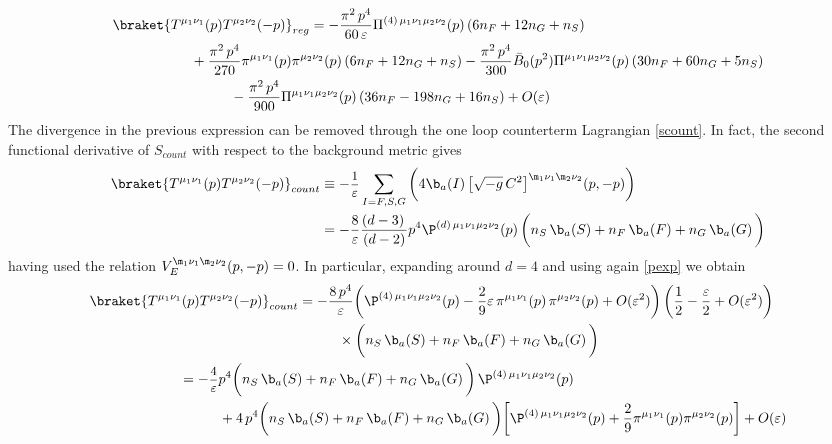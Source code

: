 \documentclass[a4paper,11pt,openright,twoside]{book}
\let\n=\nu      \let\x=\xi     \let\p=\pi      \let\r=\rho
\newcommand{\sdfrac}[2]{\mbox{\small$\displaystyle\frac{#1}{#2}$}}
\numberwithin{equation}{section}
\begin{document}
{{\begin{align}
	\label{regular}
	\braket{T^{\mu_1\nu_1}(p)T^{\mu_2\nu_2}(-p)}_{reg}&=-\frac{\p^2\,p^4}{60\,\varepsilon}\Pi^{(4)\,\mu_1\nu_1\mu_2\nu_2}(p)\left(6 n_F + 12 n_G + n_S\right)\notag\\
	&\hspace{-3cm}+\frac{\p^2\,p^4}{270}\p^{\mu_1\nu_1}(p)\p^{\mu_2\nu_2}(p)\left(6 n_F + 12 n_G + n_S\right)-\frac{\p^2\,p^4}{300}\bar{B}_0(p^2)\Pi^{\mu_1\nu_1\mu_2\nu_2}(p)\left(30n_F+60n_G+5n_S\right)\notag\\
	&\hspace{-2cm}-\frac{\p^2\,p^4}{900}\Pi^{\mu_1\nu_1\mu_2\nu_2}(p)\left(36n_F-198 n_G+16n_S\right)+O(\varepsilon)
\end{align}
The divergence in the previous expression can be removed through the one loop counterterm Lagrangian \eqref{scount}. In fact, the second functional derivative of $S_{count}$ with respect to the background metric gives 
\begin{align}
	\braket{T^{\mu_1\nu_1}(p)T^{\mu_2\nu_2}(-p)}_{count}&\equiv -\sdfrac{1}{\varepsilon}\sum_{I=F,S,G}\bigg(4\b_a(I)\,\big[\sqrt{-g}\,C^2\big]^{\m_1\n_1\m_2\n_2}(p,-p)\bigg)\notag\\
	&=-\frac{8}{\varepsilon}\frac{(d-3)\,}{(d-2)}p^4\P^{(d)\,\mu_1\nu_1\mu_2\nu_2}(p)\,\bigg(n_S\,\b_a(S)+n_F\,\b_a(F)+n_G\,\b_a(G)\,\bigg)
\end{align}
having used the relation $V_{E}^{\m_1\n_1\m_2\n_2}(p,-p)=0$. In particular, expanding around $d=4$ and using again \eqref{pexp} we obtain
\begin{align}
	\braket{T^{\mu_1\nu_1}(p)T^{\mu_2\nu_2}(-p)}_{count}&=-\frac{8\,p^4}{\varepsilon}\bigg(\P^{(4)\,\mu_1\nu_1\mu_2\nu_2}(p)-\frac{2}{9}\varepsilon\,\pi^{\mu_1\nu_1}(p)\,\pi^{\mu_2\nu_2}(p)+O(\varepsilon^2)\bigg)\,\bigg(\frac{1}{2}-\frac{\varepsilon}{2}+O(\varepsilon^2)\bigg)\notag\\
	&\hspace{1cm}\times\bigg(n_S\,\b_a(S)+n_F\,\b_a(F)+n_G\,\b_a(G)\,\bigg)\notag\\
	&\hspace{-3cm}=-\sdfrac{4}{\varepsilon}p^4\bigg(n_S\,\b_a(S)+n_F\,\b_a(F)+n_G\,\b_a(G)\,\bigg)\,\P^{(4)\,\mu_1\nu_1\mu_2\nu_2}(p)\notag\\
	&\hspace{-2cm}+4\, p^4\bigg(n_S\,\b_a(S)+n_F\,\b_a(F)+n_G\,\b_a(G)\,\bigg)\bigg[\P^{(4)\,\mu_1\nu_1\mu_2\nu_2}(p)+\frac{2}{9}\p^{\mu_1\nu_1}(p)\p^{\mu_2\nu_2}(p)\bigg]+O(\varepsilon)
\end{align}
}}
\end{document}
